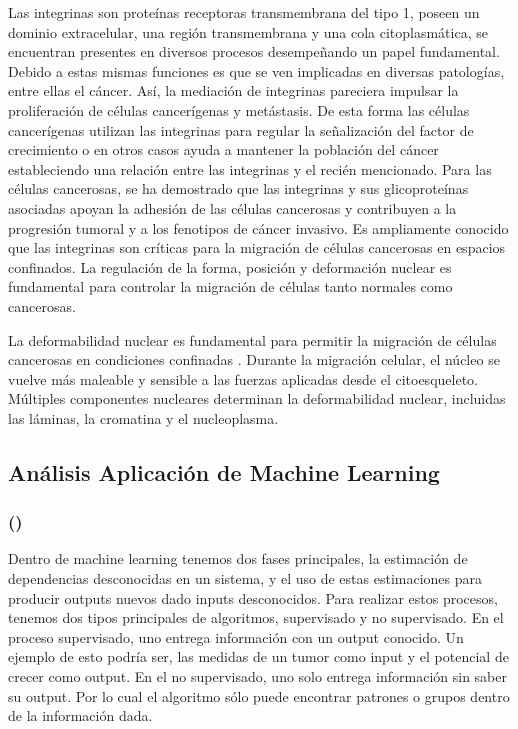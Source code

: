 \documentclass[12pt, letterpaper]{article}
\begin{document}
Las integrinas son proteínas receptoras transmembrana del tipo 1, poseen un dominio extracelular, una región transmembrana y una cola citoplasmática, se encuentran presentes en diversos procesos desempeñando un papel fundamental. Debido a estas mismas funciones es que se ven implicadas en diversas patologías, entre ellas el cáncer. Así, la mediación de integrinas pareciera impulsar la proliferación de células cancerígenas y metástasis. De esta forma las células  cancerígenas utilizan las integrinas para regular la señalización del factor de crecimiento o en otros casos ayuda a mantener la población del cáncer estableciendo una relación entre las integrinas y el recién mencionado. Para las células cancerosas, se ha demostrado que las integrinas y sus glicoproteínas asociadas apoyan la adhesión de las células cancerosas y contribuyen a la progresión tumoral y a los fenotipos de cáncer invasivo. Es ampliamente conocido que las integrinas son críticas para la migración de células cancerosas en espacios confinados. La regulación de la forma, posición y deformación nuclear es fundamental para controlar la migración de células tanto normales como cancerosas.


La deformabilidad nuclear es fundamental para permitir la migración de células cancerosas en condiciones confinadas . Durante la migración celular, el núcleo se vuelve más maleable y sensible a las fuerzas aplicadas desde el citoesqueleto. Múltiples componentes nucleares determinan la deformabilidad nuclear, incluidas las láminas, la cromatina y el nucleoplasma.


\newpage


\subsection{Análisis Aplicación de Machine Learning}


\subsubsection{\texorpdfstring{ (\citeauthor{kourouMachineLearningApplications2015})}{}}

Dentro de machine learning tenemos dos fases principales, la estimación de dependencias desconocidas en un sistema, y el uso de estas estimaciones para producir outputs nuevos dado inputs desconocidos. Para realizar estos procesos, tenemos dos tipos principales de algoritmos, supervisado y no supervisado. En el proceso supervisado, uno entrega información con un output conocido. Un ejemplo de esto podría ser, las medidas de un tumor como input y el potencial de crecer como output. En el no supervisado, uno solo entrega información sin saber su output. Por lo cual el algoritmo sólo puede encontrar patrones o grupos dentro de la información dada.
\end{document}
